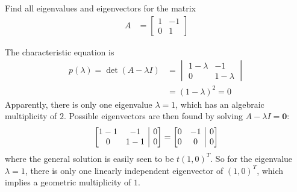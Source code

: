 \begin{exmp}
\label{exmp:dummyjordan}
Find all eigenvalues and eigenvectors for the matrix
\begin{align*}
A &=
\begin{bmatrix}
1 & -1 \\
0 & 1
\end{bmatrix}
\end{align*}
\end{exmp}
\begin{solution}
The characteristic equation is
\begin{align*}
p(\lambda) = \det(A - \lambda I) &= 
\begin{vmatrix}
1-\lambda & -1 \\
0 & 1-\lambda
\end{vmatrix} \\
&= (1-\lambda)^2 = 0
\end{align*}
Apparently, there is only one eigenvalue $\lambda = 1$, which has an algebraic multiplicity of $2$. Possible eigenvectors are then found by solving $A-\lambda I = \textbf{0}$:
\begin{align*}
\left[\begin{array}{@{}cc|c@{}}
1-1 & -1 & 0 \\
0 & 1-1 & 0
\end{array}\right] 
= 
\left[\begin{array}{@{}cc|c@{}}
0 & -1 & 0 \\
0 & 0 & 0
\end{array}\right]
\end{align*}
where the general solution is easily seen to be $t(1,0)^T$. So for the eigenvalue $\lambda = 1$, there is only one linearly independent eigenvector of $(1,0)^T$, which implies a geometric multiplicity of $1$.
\end{solution}

